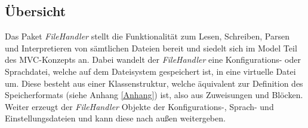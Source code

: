 \documentclass[parskip=full]{scrartcl}
\begin{document}
\subsection{Übersicht}
Das Paket \textit{FileHandler} stellt die Funktionalität zum Lesen, Schreiben, Parsen und Interpretieren von sämtlichen Dateien bereit und siedelt sich im Model Teil des MVC-Konzepts an.
Dabei wandelt der \textit{FileHandler} eine Konfigurations- oder Sprachdatei, welche auf dem Dateisystem gespeichert ist, in eine virtuelle Datei um.
Diese besteht aus einer Klassenstruktur, welche äquivalent zur Definition des Speicherformats (siehe Anhang \ref{Anhang}) ist, also aus Zuweisungen und Blöcken.
Weiter erzeugt der \textit{FileHandler} Objekte der Konfigurations-, Sprach- und Einstellungsdateien und kann diese nach außen weitergeben.
\end{document}
